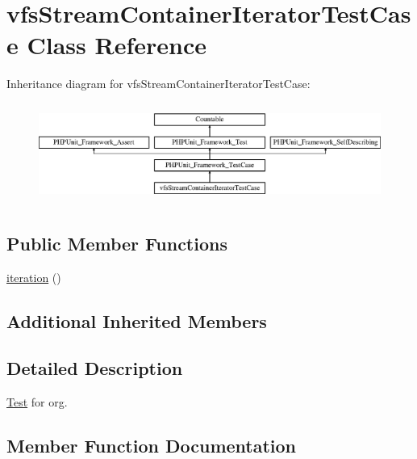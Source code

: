 \hypertarget{classorg_1_1bovigo_1_1vfs_1_1vfs_stream_container_iterator_test_case}{}\section{vfs\+Stream\+Container\+Iterator\+Test\+Case Class Reference}
\label{classorg_1_1bovigo_1_1vfs_1_1vfs_stream_container_iterator_test_case}
Inheritance diagram for vfs\+Stream\+Container\+Iterator\+Test\+Case\+:\begin{figure}[H]
\begin{center}
\leavevmode
\includegraphics[height=3.303835cm]{classorg_1_1bovigo_1_1vfs_1_1vfs_stream_container_iterator_test_case}
\end{center}
\end{figure}
\subsection*{Public Member Functions}
\begin{DoxyCompactItemize}
\item 
\mbox{\hyperlink{classorg_1_1bovigo_1_1vfs_1_1vfs_stream_container_iterator_test_case_a5b8317dbdeb16714af22edb9fc90d759}{iteration}} ()
\end{DoxyCompactItemize}
\subsection*{Additional Inherited Members}


\subsection{Detailed Description}
\mbox{\hyperlink{class_test}{Test}} for org. 

\subsection{Member Function Documentation}
\mbox{\label{classorg_1_1bovigo_1_1vfs_1_1vfs_stream_container_iterator_test_case_a5b8317dbdeb16714af22edb9fc90d759}} 
